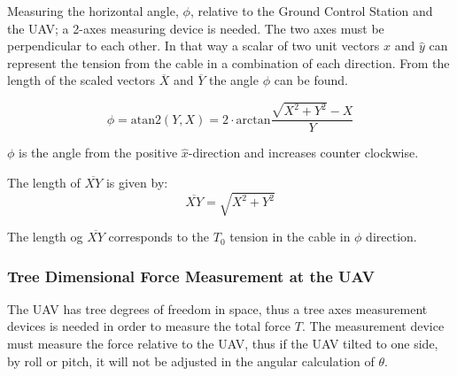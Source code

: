 \noindent
Measuring the horizontal angle, $\phi$, relative to the Ground Control Station and the UAV; a 2-axes measuring device is needed. The two axes must be perpendicular to each other. In that way a scalar of two unit vectors $\hat{x}$ and $\hat{y}$ can represent the tension from the cable in a combination of each direction. 
From the length of the scaled vectors $\overline{X}$ and $\overline{Y}$ the angle $\phi$ can be found.

\begin{equation}
\phi = \mathrm{atan2} (Y,  X) = 2 \cdot \mathrm{arctan} \frac{\sqrt{X^2+Y^2}-X}{Y}
\end{equation}

\noindent
$\phi$ is the angle from the positive $\hat{x}$-direction and increases counter clockwise. 

\noindent
The length of $\overline{XY}$ is given by:
\begin{equation}
\overline{XY} = \sqrt{X^2+Y^2}
\end{equation}

\noindent
The length og $\overline{XY}$ corresponds to the $T_0$ tension in the cable in $\phi$ direction. 

\subsubsection{Tree Dimensional Force Measurement at the UAV}
The UAV has tree degrees of freedom in space, thus a tree axes measurement devices is needed in order to measure the total force $T$.  The measurement device must measure the force relative to the UAV, thus if the UAV tilted to one side, by roll or pitch, it will not be adjusted in the angular calculation of $\theta$.  


